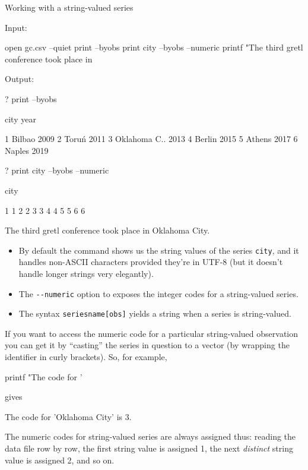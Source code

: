 \begin{script}[htbp]
  \caption{Working with a string-valued series}
  \label{listing:cities}
 Input:
\begin{scodebit}
open gc.csv --quiet
print --byobs
print city --byobs --numeric
printf "The third gretl conference took place in %
\end{scodebit}

Output:
\begin{outbit}
? print --byobs

          city         year

1       Bilbao         2009
2        Toruń         2011
3 Oklahoma C..         2013
4       Berlin         2015
5       Athens         2017
6       Naples         2019

? print city --byobs --numeric

          city

1            1
2            2
3            3
4            4
5            5
6            6

The third gretl conference took place in Oklahoma City.
\end{outbit}
\end{script}

\begin{itemize}
\item By default the  command shows us the string values
  of the series \texttt{city}, and it handles non-ASCII characters
  provided they're in UTF-8 (but it doesn't handle longer strings
  very elegantly).
\item The \verb|--numeric| option to  exposes the
  integer codes for a string-valued series.
\item The syntax \texttt{seriesname[obs]} yields a string when a
  series is string-valued.
\end{itemize}

If you want to access the numeric code for a particular string-valued
observation you can get it by ``casting'' the series in question to a
vector (by wrapping the identifier in curly brackets). So, for
example,
\begin{code}
printf "The code for '%
\end{code}
gives
\begin{code}
The code for 'Oklahoma City' is 3.
\end{code}

The numeric codes for string-valued series are always assigned thus:
reading the data file row by row, the first string value is assigned
1, the next \textit{distinct} string value is assigned 2, and so on.

